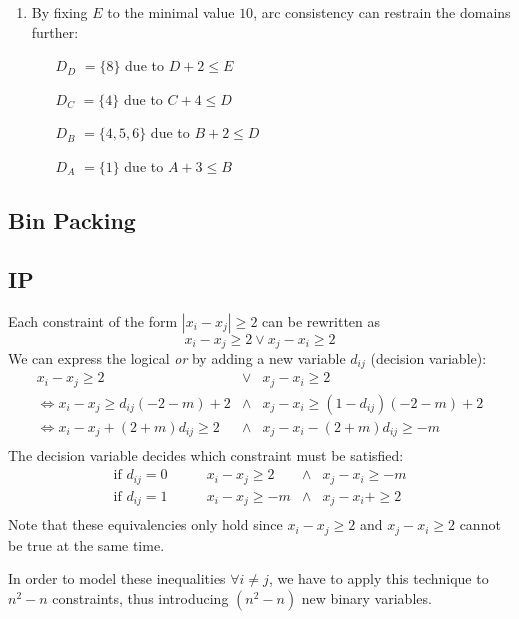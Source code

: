 \documentclass[a4paper, oneside]{scrartcl}
\begin{document}
\begin{enumerate}
\item By fixing $E$ to the minimal value $10$, arc consistency can restrain the domains further:

\begin{itemize}
\item[$D_D$] $ = \{8\}$ due to $D + 2 \leq E$
\item[$D_C$] $ = \{4\}$ due to $C + 4 \leq D$
\item[$D_B$] $ = \{4, 5, 6\}$ due to $B + 2 \leq D$
\item[$D_A$] $ = \{1\}$ due to $A + 3 \leq B$
\end{itemize}
 
    
\end{enumerate}


\subsection{Bin Packing}

\subsection{IP}

Each constraint of the form $|x_i - x_j| \geq 2$ can be rewritten as
\[x_i - x_j \geq 2 \vee x_j - x_i \geq 2\]
We can express the logical \emph{or} by adding a 
new variable $d_{ij}$ (decision variable):
\[ \begin{array} {ccc}
x_i-x_j \geq 2 & \vee & x_j-x_i \geq 2 \\
\Leftrightarrow x_i - x_j \geq d_{ij}(-2-m) +2 &\wedge& x_j - x_i \geq (1-d_{ij})(-2-m) +2 \\
\Leftrightarrow x_i - x_j + (2+m)d_{ij} \geq 2 &\wedge& x_j - x_i - (2+m)d_{ij}\geq  -m \\
\end{array} \]
The decision variable decides which constraint must be satisfied: 
\[ \begin{array} {cccc}
\text{if } d_{ij} = 0 \qquad & x_i - x_j \geq 2 &\wedge& x_j - x_i \geq -m \\
\text{if } d_{ij} = 1 \qquad & x_i - x_j \geq -m &\wedge& x_j - x_i + \geq  2 \\
\end{array} \]
Note that these equivalencies only hold since $x_i-x_j \geq 2$ and $x_j-x_i \geq 2$ cannot be true at the same time.

In order to model these inequalities $\forall i\neq j$, we have to apply this technique to $n^2  -n$ constraints, 
thus introducing $(n^2-n)$ new binary variables.
\end{document}
